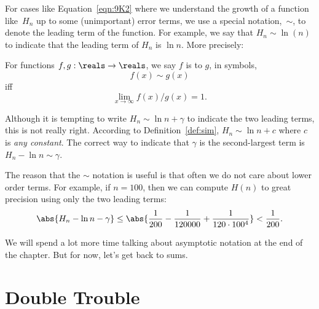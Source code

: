 For cases like Equation~\ref{eqn:9K2} where we understand the growth
of a function like~$H_n$ up to some (unimportant) error terms, we use
a special notation,~$\sim$, to denote the leading term of the
function.  For example, we say that $H_n \sim \ln(n)$ to indicate that
the leading term of $H_n$ is $\ln n$.  More precisely:
\begin{definition}\label{def:sim}
  For functions $f,g: \reals \to \reals$, we say $f$ is  to $g$, in symbols,
\[
f(x) \sim g(x)
\]
iff
\[
\lim_{x \rightarrow \infty} f(x)/g(x) = 1.
\]
\end{definition}

Although it is tempting to write $H_n \sim \ln n + \gamma$ to indicate
the two leading terms, this is not really right.  According to
Definition~\ref{def:sim}, $H_n \sim \ln n + c$ where $c$ is \emph{any
  constant}.  The correct way to indicate that $\gamma$ is the
second-largest term is $H_n - \ln n \sim \gamma$.

The reason that the $\sim$ notation is useful is that often we do not care
about lower order terms.  For example, if $n = 100$, then we can compute
$H(n)$ to great precision using only the two leading terms:
\[
\abs{H_n - \ln n - \gamma} \leq \abs{\frac{1}{200} - \frac{1}{120000} +
\frac{1}{120 \cdot 100^4}} < \frac{1}{200}.
\]

We will spend a lot more time talking about asymptotic notation at the
end of the chapter.  But for now, let's get back to sums.

\begin{problems}
\classproblems
{}

\homeworkproblems
{}

\end{problems}


\section{Double Trouble}

